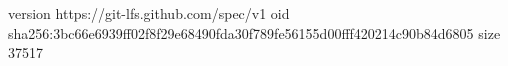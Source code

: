 version https://git-lfs.github.com/spec/v1
oid sha256:3bc66e6939ff02f8f29e68490fda30f789fe56155d00fff420214c90b84d6805
size 37517
